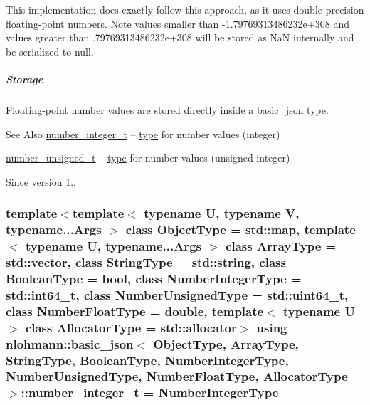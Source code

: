 This implementation does exactly follow this approach, as it uses double precision floating-\/point numbers. Note values smaller than {\ttfamily -\/1.\-79769313486232e+308} and values greater than {.\-79769313486232e+308} will be stored as Na\-N internally and be serialized to {\ttfamily null}.

\subparagraph*{Storage}

Floating-\/point number values are stored directly inside a \hyperlink{classnlohmann_1_1basic__json}{basic\-\_\-json} type.

\begin{DoxySeeAlso}{See Also}
\hyperlink{classnlohmann_1_1basic__json_ac4b10b2364f26ce47bdb9a413ff04a59}{number\-\_\-integer\-\_\-t} -- \hyperlink{classnlohmann_1_1basic__json_a5d466b240d0ba9f648d7fd4ff42359f5}{type} for number values (integer)

\hyperlink{classnlohmann_1_1basic__json_a60a04166c122072ab11eaf9845d9cd1d}{number\-\_\-unsigned\-\_\-t} -- \hyperlink{classnlohmann_1_1basic__json_a5d466b240d0ba9f648d7fd4ff42359f5}{type} for number values (unsigned integer)
\end{DoxySeeAlso}
\begin{DoxySince}{Since}
version 1.. 
\end{DoxySince}
\hypertarget{classnlohmann_1_1basic__json_ac4b10b2364f26ce47bdb9a413ff04a59}{
\subsubsection[{number\-\_\-integer\-\_\-t}]{\setlength{\rightskip}{0pt plus 5cm}template$<$template$<$ typename U, typename V, typename...\-Args $>$ class Object\-Type = std\-::map, template$<$ typename U, typename...\-Args $>$ class Array\-Type = std\-::vector, class String\-Type  = std\-::string, class Boolean\-Type  = bool, class Number\-Integer\-Type  = std\-::int64\-\_\-t, class Number\-Unsigned\-Type  = std\-::uint64\-\_\-t, class Number\-Float\-Type  = double, template$<$ typename U $>$ class Allocator\-Type = std\-::allocator$>$ using {\bf nlohmann\-::basic\-\_\-json}$<$ Object\-Type, Array\-Type, String\-Type, Boolean\-Type, Number\-Integer\-Type, Number\-Unsigned\-Type, Number\-Float\-Type, Allocator\-Type $>$\-::{\bf number\-\_\-integer\-\_\-t} =  Number\-Integer\-Type}}\label{classnlohmann_1_1basic__json_ac4b10b2364f26ce47bdb9a413ff04a59}


